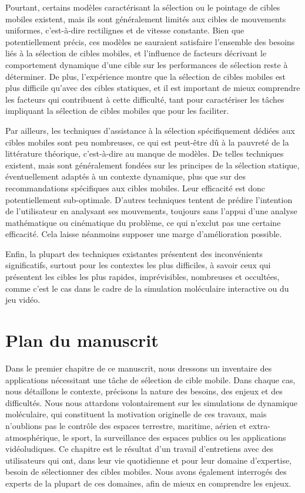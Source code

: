 	Pourtant, certains modèles caractérisant la sélection ou le pointage de cibles mobiles existent, mais ils sont généralement limités aux cibles de mouvements uniformes, c'est-à-dire rectilignes et de vitesse constante. Bien que potentiellement précis, ces modèles ne sauraient satisfaire l'ensemble des besoins liés à la sélection de cibles mobiles, et l'influence de facteurs décrivant le comportement dynamique d'une cible sur les performances de sélection reste à déterminer. De plus, l'expérience montre que la sélection de cibles mobiles est plus difficile qu'avec des cibles statiques, et il est important de mieux comprendre les facteurs qui contribuent à cette difficulté, tant pour caractériser les tâches impliquant la sélection de cibles mobiles que pour les faciliter.
	
	Par ailleurs, les techniques d'assistance à la sélection spécifiquement dédiées aux cibles mobiles sont peu nombreuses, ce qui est peut-être dû à la pauvreté de la littérature théorique, c'est-à-dire au manque de modèles. De telles techniques existent, mais sont généralement fondées sur les principes de la sélection statique, éventuellement adaptés à un contexte dynamique, plus que sur des recommandations spécifiques aux cibles mobiles. Leur efficacité est donc potentiellement sub-optimale. D'autres techniques tentent de prédire l'intention de l'utilisateur en analysant ses mouvements, toujours sans l'appui d'une analyse mathématique ou cinématique du problème, ce qui n'exclut pas une certaine efficacité. Cela laisse néanmoins supposer une marge d'amélioration possible.
	
	Enfin, la plupart des techniques existantes présentent des inconvénients significatifs, surtout pour les contextes les plus difficiles, à savoir ceux qui présentent les cibles les plus rapides, imprévisibles, nombreuses et occultées, comme c'est le cas dans le cadre de la simulation moléculaire interactive ou du jeu vidéo.

\section*{Plan du manuscrit}
	Dans le premier chapitre de ce manuscrit, nous dressons un inventaire des applications nécessitant une tâche de sélection de cible mobile. Dans chaque cas, nous détaillons le contexte, précisons la nature des besoins, des enjeux et des difficultés. Nous nous attardons volontairement sur les simulations de dynamique moléculaire, qui constituent la motivation originelle de ces travaux, mais n'oublions pas le contrôle des espaces terrestre, maritime, aérien et extra-atmosphérique, le sport, la surveillance des espaces publics ou les applications vidéoludiques. Ce chapitre est le résultat d'un travail d'entretiens avec des utilisateurs qui ont, dans leur vie quotidienne et pour leur domaine d'expertise, besoin de sélectionner des cibles mobiles. Nous avons également interrogés des experts de la plupart de ces domaines, afin de mieux en comprendre les enjeux.
	
